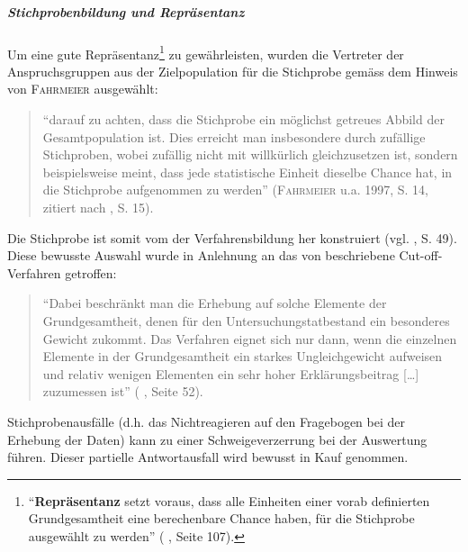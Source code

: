 \documentclass[../../main.tex]{subfiles}
\begin{document}
\subparagraph*{Stichprobenbildung und Repräsentanz}\mbox{}

\begin{sloppypar}
Um eine gute Repräsentanz\footnote{"`\textbf{Repräsentanz} setzt voraus, dass alle Einheiten einer vorab definierten Grundgesamtheit eine berechenbare Chance haben, für die Stichprobe ausgewählt zu werden"' (\citeauthor{berekoven_marktforschung:_2009} \citeyear{berekoven_marktforschung:_2009}, Seite 107).} zu gewährleisten, wurden die Vertreter der Anspruchsgruppen aus der Zielpopulation für die Stichprobe gemäss dem Hinweis von \textsc{Fahrmeier} ausgewählt:

\begin{quote}
"`darauf zu achten, dass die Stichprobe ein möglichst getreues Abbild der Gesamtpopulation ist. Dies erreicht man insbesondere durch zufällige Stichproben, wobei zufällig nicht mit willkürlich gleichzusetzen ist, sondern beispielsweise meint, dass jede statistische Einheit dieselbe Chance hat, in die Stichprobe aufgenommen zu werden"' (\textsc{Fahrmeier} u.a. 1997, S. 14, zitiert nach \cite{kirchhoff_fragebogen:_2010}, S. 15).
\end{quote}

Die Stichprobe ist somit vom der Verfahrensbildung her konstruiert (vgl. \cite{berekoven_marktforschung:_2009}, S. 49). Diese bewusste Auswahl wurde in Anlehnung an das von \cite{berekoven_marktforschung:_2009} beschriebene Cut-off-Verfahren getroffen:

\begin{quote}
"`Dabei beschränkt man die Erhebung auf solche Elemente der Grundgesamtheit, denen für den Untersuchungstatbestand ein besonderes Gewicht zukommt. Das Verfahren eignet sich nur dann, wenn die einzelnen Elemente in der Grundgesamtheit ein starkes Ungleichgewicht aufweisen und relativ wenigen Elementen ein sehr hoher Erklärungsbeitrag [\dots] zuzumessen ist"' (\citeauthor{berekoven_marktforschung:_2009} \citeyear{berekoven_marktforschung:_2009}, Seite 52).
\end{quote}

Stichprobenausfälle (d.h. das Nichtreagieren auf den Fragebogen bei der Erhebung der Daten) kann zu einer Schweigeverzerrung bei der Auswertung führen. Dieser partielle Antwortausfall wird bewusst in Kauf genommen. 
\end{sloppypar}
\end{document}
